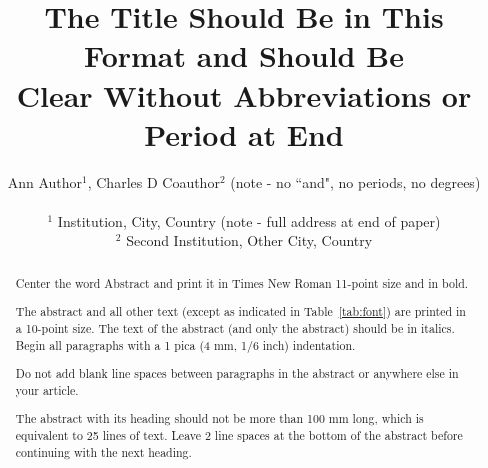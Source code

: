 \documentclass[twocolumn]{cinc}
\begin{document}


\title{The Title Should Be in This Format and Should Be \\
Clear Without Abbreviations or Period at End}


\author {Ann Author$^{1}$, Charles D Coauthor$^{2}$ (note - no ``and", no periods, no degrees) \\
\ \\ %
 $^1$ Institution, City, Country (note - full address at end of paper) \\
$^2$  Second Institution, Other City, Country  }

\maketitle

\begin{abstract}

    Center the word Abstract and print it in Times New Roman 11-point size
    and in bold.

% 
% 
    The abstract and all other text (except as indicated in
    Table~\ref{tab:font}) are printed in a 10-point size. The text of the
    abstract (and only the abstract) should be in italics. Begin all
    paragraphs with a 1 pica (4 mm, 1/6 inch) indentation.

    Do not add blank line spaces between paragraphs in the abstract or
    anywhere else in your article.

    The abstract with its heading should not be more than 100 mm long,
    which is equivalent to 25 lines of text. Leave 2 line spaces at the
    bottom of the abstract before continuing with the next heading.

\end{abstract}
\end{document}
